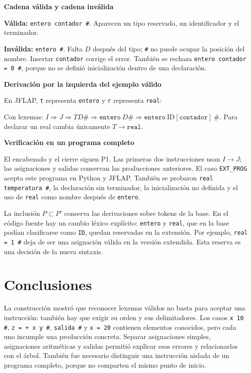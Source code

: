 \documentclass[11pt,letterpaper]{article}
\newcommand{\cod}[1]{\texttt{#1}}
\newcommand{\subtitulo}[1]{\vspace{5pt}\textbf{#1}\par\nopagebreak[4]}
\newcommand{\ID}[1]{\ensuremath{\mathrm{ID}[\texttt{#1}]}}
\begin{document}
\subtitulo{Cadena válida y cadena inválida}
\textbf{Válida:} \cod{entero contador \#}. Aparecen un tipo reservado, un identificador y el terminador.

\textbf{Inválida:} \cod{entero \#}. Falta $D$ después del tipo; \cod{\#} no puede ocupar la posición del nombre. Insertar \cod{contador} corrige el error. También se rechaza \cod{entero contador = 0 \#}, porque no se definió inicialización dentro de una declaración.

\subtitulo{Derivación por la izquierda del ejemplo válido}
En JFLAP, \cod{t} representa \cod{entero} y \cod{r} representa \cod{real}:
\begin{center}

\end{center}
Con lexemas: $I\Rightarrow J\Rightarrow TD\#\Rightarrow\cod{entero}\ D\#\Rightarrow\cod{entero}\ \ID{contador}\ \#$. Para declarar un real cambia únicamente $T\to\cod{real}$.

\newpage
\subtitulo{Verificación en un programa completo}

El encabezado y el cierre siguen P1. Las primeras dos instrucciones usan $I\to J$; las asignaciones y salidas conservan las producciones anteriores. El caso \cod{EXT\_PROG} acepta este programa en Python y JFLAP. También se probaron \cod{real temperatura \#}, la declaración sin terminador, la inicialización no definida y el uso de \cod{real} como nombre después de \cod{entero}.

La inclusión $P\subset P'$ conserva las derivaciones sobre tokens de la base. En el código fuente hay un cambio léxico explícito: \cod{entero} y \cod{real}, que en la base podían clasificarse como \cod{ID}, quedan reservadas en la extensión. Por ejemplo, \cod{real = 1 \#} deja de ser una asignación válida en la versión extendida. Esta reserva es una decisión de la nueva sintaxis.

\section{Conclusiones}
La construcción mostró que reconocer lexemas válidos no basta para aceptar una instrucción: también hay que exigir su orden y sus delimitadores. Los casos \cod{x 10 \#}, \cod{z = + x y \#}, \cod{salida \#} y \cod{x = 20} contienen elementos conocidos, pero cada uno incumple una producción concreta. Separar asignaciones simples, asignaciones aritméticas y salidas permitió explicar esos errores y relacionarlos con el árbol. También fue necesario distinguir una instrucción aislada de un programa completo, porque no comparten el mismo punto de inicio.
\end{document}
